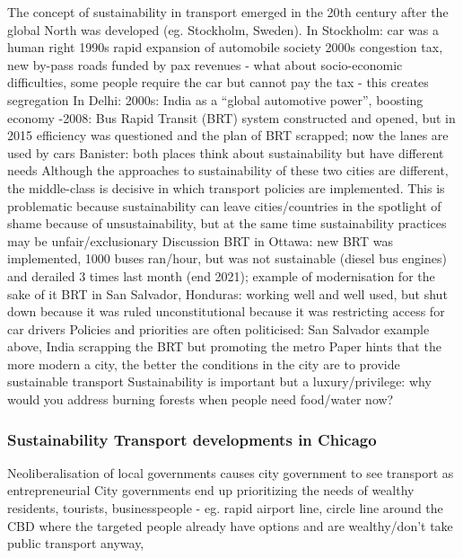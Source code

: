 \documentclass{article}
\begin{document}
\begin{outline}
	\1 The concept of sustainability in transport emerged in the 20th century after the global North was developed (eg. Stockholm, Sweden). 
	\1 In Stockholm: 
		 car was a human right
		\2 1990s rapid expansion of automobile society
		\2 2000s congestion tax, new by-pass roads funded by pax revenues - what about socio-economic difficulties, some people require the car but cannot pay the tax - this creates segregation
	\1 In Delhi:
		\2 2000s: India as a ``global automotive power'', boosting economy
		-2008: Bus Rapid Transit (BRT) system constructed and opened, but in 2015 efficiency was questioned and the plan of BRT scrapped; now the lanes are used by cars
	\1 Banister: both places think about sustainability but have different needs 
	\1 Although the approaches to sustainability of these two cities are different, the middle-class is decisive in which transport policies are implemented. This is problematic because sustainability can leave cities/countries in the spotlight of shame because of unsustainability, but at the same time sustainability practices may be unfair/exclusionary
	\1 Discussion
		\2 BRT in Ottawa: new BRT was implemented, 1000 buses ran/hour, but was not sustainable (diesel bus engines) and derailed 3 times last month (end 2021); example of modernisation for the sake of it
		\2 BRT in San Salvador, Honduras: working well and well used, but shut down because it was ruled unconstitutional because it was restricting access for car drivers
		\2 Policies and priorities are often politicised: San Salvador example above, India scrapping the BRT but promoting the metro
		\2 Paper hints that the more modern a city, the better the conditions in the city are to provide sustainable transport
		\2 Sustainability is important but a luxury/privilege: why would you address burning forests when people need food/water now?
\end{outline}

\subsubsection{Sustainability Transport developments in Chicago}

\begin{outline}
	\1 Neoliberalisation of local governments causes city government to see transport as entrepreneurial
	\1 City governments end up prioritizing the needs of wealthy residents, tourists, businesspeople - eg. rapid airport line, circle line around the CBD where the targeted people already have options and are wealthy/don't take public transport anyway, 
\end{outline}
\end{document}
